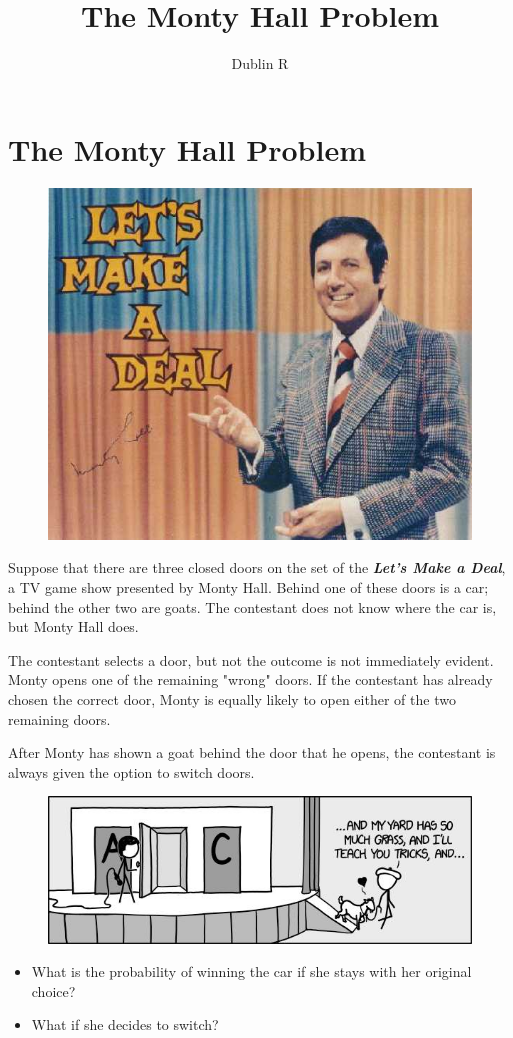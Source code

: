 \documentclass[11pt]{article} %
\title{The Monty Hall Problem}
\author{Dublin R}
\begin{document}
\maketitle

\section{The Monty Hall Problem}
\begin{figure}[h!]
\centering
\includegraphics[width=0.5\linewidth]{./MH1}
\caption{}
\label{Monty Hall}
\end{figure}

Suppose that there are three closed doors on the set of the \textbf{\textit{Let's Make a Deal}}, a TV game
show presented by Monty Hall. Behind one of these doors is a car; behind the other two are
goats. The contestant does not know where the car is, but Monty Hall does.

The contestant selects a door, but not the outcome is not immediately evident. Monty
opens one of the remaining "wrong" doors. If the contestant has already chosen the correct
door, Monty is equally likely to open either of the two remaining doors.

After Monty has shown a goat behind the door that he opens, the contestant is always given the option to switch doors. 

\begin{figure}
\centering
\includegraphics[width=0.7\linewidth]{./MontyHall}
\caption{}
\label{fig:MH1}
\end{figure}

\begin{itemize}
\item What is the probability of winning the car if she stays with her original choice? 
\item What if she decides to switch?
\end{itemize}
\end{document}

